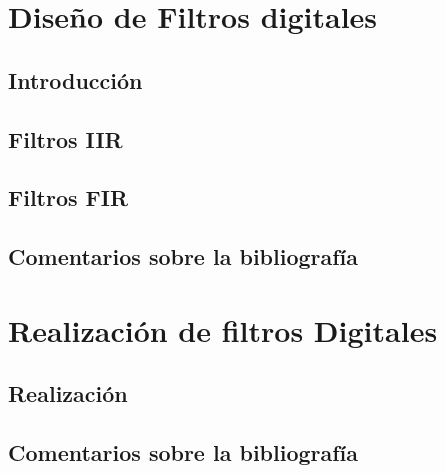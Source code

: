 \documentclass[oneside,a4paper,10pt]{scrbook}
\begin{document}
    \clearpage
        
	\chapter{Diseño de Filtros digitales}{
	
		\section{Introducción}
   		{
    						
		}
		
		\clearpage
		
		\section{Filtros IIR}
   		{
    							
		}
		
		\clearpage
		
		\section{Filtros FIR}
   		{
    							
		}
		
		\clearpage
		
		\section{Comentarios sobre la bibliografía}
	   	{
    							
		}
	}
	
	\clearpage
	
	\chapter{Realización de filtros Digitales}
	{
		\section{Realización}
		{
			
		}
		
		\clearpage	
		
		\section{Comentarios sobre la bibliografía}
		{
			
		}	
	}
	
	\clearpage
\end{document}
